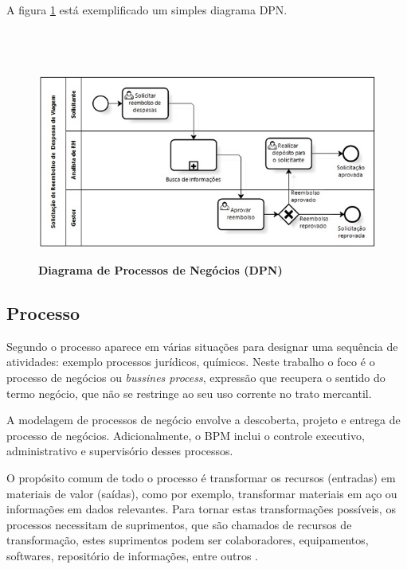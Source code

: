 \documentclass[
	12pt,				%
	openright,			%
	oneside,			%
	a4paper,			%
	chapter=TITLE,		%
	section=TITLE,		%
	english,			%
	french,				%
	spanish,			%
	brazil				%
	]{abntex2}
\begin{document}
A figura \ref{fig-bpmn-exemplo} está exemplificado um simples diagrama DPN.
\\ \\ \\ \\ 

\begin{figure}[htb]
	\begin{center}
		\caption{
			\textbf{Diagrama de Processos de Negócios (DPN)}
		}\label{fig-bpmn-exemplo}
		\includegraphics [scale=0.8]{imagens/bpmn_exemplo.jpg}
		\label{fig-bpmn-exemplo}
	\end{center}
\end{figure}
 



\subsection{Processo}
Segundo  o processo aparece em várias situações para designar uma sequência de atividades: exemplo processos jurídicos, químicos. Neste trabalho o foco é o processo de negócios ou \textit{bussines process}, expressão que recupera o sentido do termo negócio, que não se restringe ao seu uso corrente no trato mercantil. 

A modelagem de processos de negócio envolve a descoberta, projeto e entrega de processo de negócios. Adicionalmente, o BPM inclui o controle executivo, administrativo e supervisório desses processos.

O propósito comum de todo o processo é transformar os recursos (entradas) em materiais de valor (saídas), como por exemplo, transformar materiais em aço ou informações em dados relevantes. Para tornar estas transformações possíveis, os processos necessitam de suprimentos, que são chamados de recursos de transformação, estes suprimentos podem ser colaboradores, equipamentos, softwares, repositório de informações, entre outros \cite{baldamBPM}.
\end{document}
